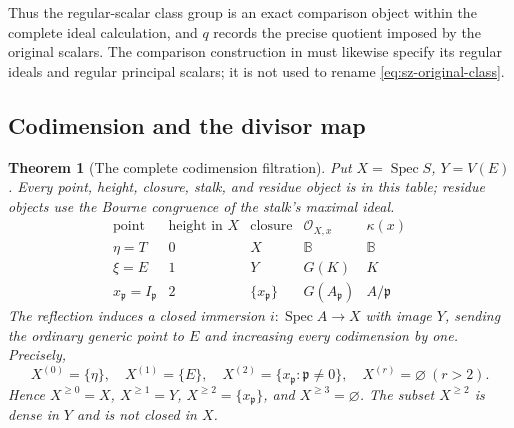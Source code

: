 \documentclass[11pt,a4paper]{article}
\newtheorem{theorem}{Theorem}[section]
\theoremstyle{definition}\newtheorem{definition}[theorem]{Definition}
\begin{document}
Thus the regular-scalar class group is an exact comparison object
within the complete ideal calculation, and \(q\) records the precise
quotient imposed by the original scalars. The comparison construction
in \cite[\texttt{cor:dedekind-preservation}]{support} must likewise
specify its regular ideals and regular principal scalars; it is not
used to rename \eqref{eq:sz-original-class}.

\subsection{Codimension and the divisor map}

\begin{theorem}[The complete codimension filtration]\label{thm:sz-codimension}
Put \(X=\operatorname{Spec}S\), \(Y=V(E)\).
Every point, height, closure, stalk, and residue object is in this table;
residue objects use the Bourne congruence of the stalk's maximal ideal.
\[
\begin{array}{c|c|c|c|c}
\text{point}&\text{height in }X&\text{closure}&\mathcal O_{X,x}&\kappa(x)\\ \hline
\eta=T&0&X&\mathbb B&\mathbb B\\
\xi=E&1&Y&G(K)&K\\
x_{\mathfrak p}=I_{\mathfrak p}&2&\{x_{\mathfrak p}\}
 &G(A_{\mathfrak p})&A/\mathfrak p
\end{array}
\]
The reflection induces a closed immersion
\(i:\operatorname{Spec}A\to X\) with image \(Y\), sending the ordinary
generic point to \(E\) and increasing every codimension by one.
Precisely,
\begin{equation}\label{eq:sz-codim-filtration}
 X^{(0)}=\{\eta\},\quad X^{(1)}=\{E\},\quad
 X^{(2)}=\{x_{\mathfrak p}:\mathfrak p\ne0\},\quad
 X^{(r)}=\varnothing\ (r>2).
\end{equation}
Hence \(X^{\ge0}=X\), \(X^{\ge1}=Y\),
\(X^{\ge2}=\{x_{\mathfrak p}\}\), and \(X^{\ge3}=\varnothing\).
The subset \(X^{\ge2}\) is dense in \(Y\) and is not closed in \(X\).
\end{theorem}
\end{document}
